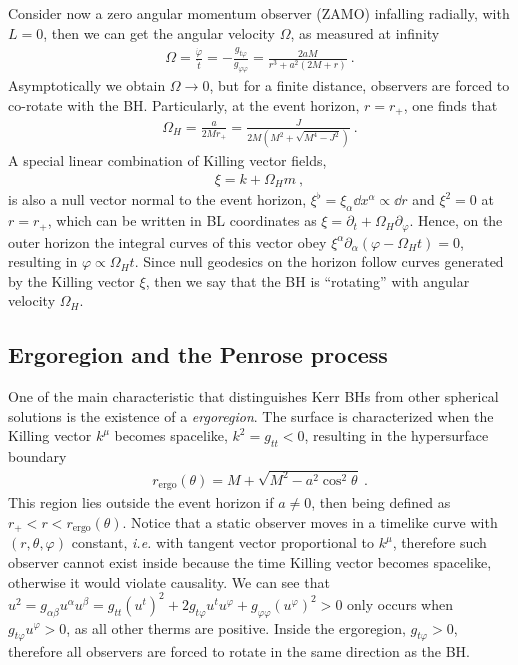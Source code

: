 Consider now a zero angular momentum observer (ZAMO) infalling radially, with $L=0$, then we can get the angular velocity $\Omega$, as measured at infinity
\begin{align}
    \Omega = \frac{\dot{\varphi}}{\dot{t}} = - \frac{g_{t\varphi}}{g_{\varphi\varphi}} = \frac{2 a M}{r^3 + a^2 (2 M+r)} ~.
    \label{eq2:angMomentumZAMO}
\end{align}
Asymptotically we obtain $\Omega\to0$, but for a finite distance, observers are forced to co-rotate with the BH. 
Particularly, at the event horizon, $r=r_+$, one finds that
\begin{align}
    \Omega_H = \frac{a}{2 M r_+} = \frac{J}{2 M \left(M^2+\sqrt{M^4-J^2}\right)} ~.
    \label{eq2:angMomentumH}
\end{align}
A special linear combination of Killing vector fields,
\begin{align}
    \xi = k + \Omega_H m ~,
    \label{eq2:KillingXi}
\end{align}
is also a null vector normal to the event horizon, $\xi^\flat=\xi_\alpha \dd x^\alpha \propto \dd r$ and $\xi^2 = 0$ at $r=r_+$, which can be written in BL coordinates as $\xi = \partial_t + \Omega_H \partial_\varphi$.
Hence, on the outer horizon the integral curves of this vector obey $\xi^\alpha \partial_\alpha (\varphi - \Omega_H t) = 0$, resulting in $\varphi \propto \Omega_H t$.
Since null geodesics on the horizon follow curves generated by the Killing vector $\xi$, then we say that the BH is ``rotating'' with angular velocity $\Omega_H$.

\subsection{Ergoregion and the Penrose process}

One of the main characteristic that distinguishes Kerr BHs from other spherical solutions is the existence of a \emph{ergoregion}.
The surface is characterized when the Killing vector $k^\mu$ becomes spacelike, $k^2=g_{tt}<0$, resulting in the hypersurface boundary
\begin{align}
    r_{\mathrm{ergo}}(\theta) = M + \sqrt{M^2 - a^2 \cos^2\theta} ~.
    \label{eq2:KerrErgo}
\end{align}
This region lies outside the event horizon if $a\ne0$, then being defined as $r_+< r < r_{\mathrm{ergo}}(\theta)$.
Notice that a static observer moves in a timelike curve with $(r,\theta,\varphi)$ constant, \emph{i.e.} with tangent vector proportional to $k^\mu$, therefore such observer cannot exist inside because the time Killing vector becomes spacelike, otherwise it would violate causality. We can see that $u^2=g_{\alpha\beta}u^\alpha u^\beta = g_{tt} (u^t)^2 + 2 g_{t\varphi} u^t u^\varphi +  g_{\varphi\varphi} (u^\varphi)^2 > 0$ only occurs when $g_{t\varphi} u^\varphi > 0$, as all other therms are positive. Inside the ergoregion, $g_{t\varphi}>0$, therefore all observers are forced to rotate in the same direction as the BH.

